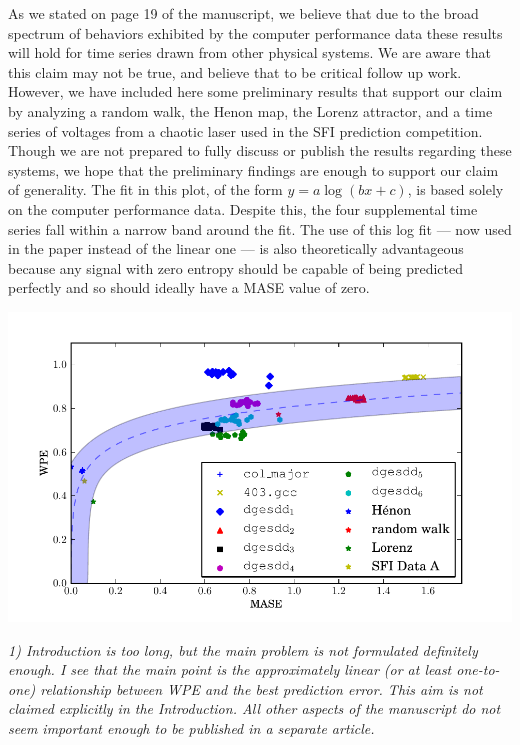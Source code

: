 \documentclass[12pt]{article}
\begin{document}
As we stated on page 19 of the manuscript, we believe that due to the broad
spectrum of behaviors exhibited by the computer performance data these results
will hold for time series drawn from other physical systems. We are aware that
this claim may not be true, and believe that to be critical follow up work.
However, we have included here some preliminary results that support our claim
by analyzing a random walk, the Henon map, the Lorenz attractor, and a time
series of voltages from a chaotic laser used in the SFI prediction competition.
Though we are not prepared to fully discuss or publish the results regarding
these systems, we hope that the preliminary findings are enough to support our
claim of generality. The fit in this plot, of the form $y = a \log(b x + c)$, is
based solely on the computer performance data. Despite this, the four
supplemental time series fall within a narrow band around the fit. The use of
this log fit --- now used in the paper instead of the linear one --- is also
theoretically advantageous because any signal with zero entropy should be
capable of being predicted perfectly and so should ideally have a MASE value of
zero.

\begin{center}
    \includegraphics[width=\columnwidth]{figs/new_prediction_vs_entropy_extra_autolog}
\end{center}

\emph{1) Introduction is too long, but the main problem is not formulated
definitely enough. I see that the main point is the approximately linear (or at
least one-to-one) relationship between WPE and the best prediction error. This
aim is not claimed explicitly in the Introduction. All other aspects of the
manuscript do not seem important enough to be published in a separate article.}
\end{document}
